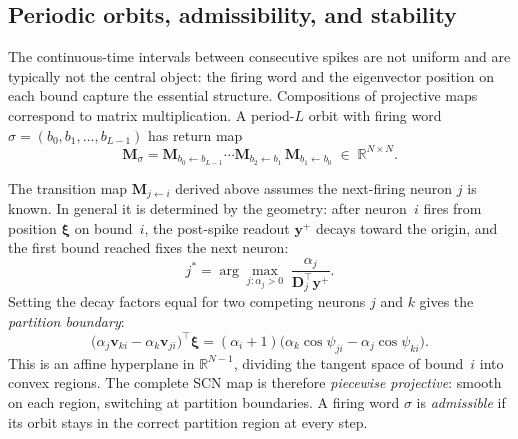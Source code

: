 \documentclass[12pt]{article}
\newcommand{\vv}[1]{\mathbf{#1}}
\newcommand{\DD}{\vv{D}}
\newcommand{\yy}{\vv{y}}
\newcommand{\xxi}{\boldsymbol{\xi}}
\newcommand{\RR}{\mathbb{R}}
\begin{document}
\subsection{Periodic orbits, admissibility, and stability}\label{sec:periodic}

The continuous-time intervals between consecutive spikes are not uniform and are typically not the central object: the firing word and the eigenvector position on each bound capture the essential structure. Compositions of projective maps correspond to matrix multiplication. A period-$L$ orbit with firing word $\sigma=(b_0,b_1,\ldots,b_{L-1})$ has return map
\begin{equation}\label{eq:return}
    \vv{M}_\sigma = \vv{M}_{b_0\leftarrow b_{L-1}}\cdots\vv{M}_{b_2\leftarrow b_1}\,\vv{M}_{b_1\leftarrow b_0}\;\in\;\RR^{N\times N}.
\end{equation}

\label{sec:partition}
The transition map $\vv M_{j\leftarrow i}$ derived above assumes the next-firing neuron $j$ is known. In general it is determined by the geometry: after neuron~$i$ fires from position $\xxi$ on bound~$i$, the post-spike readout $\yy^+$ decays toward the origin, and the first bound reached fixes the next neuron:
\begin{equation}\label{eq:first-bound}
    j^* = \arg\max_{j:\alpha_j>0}\;\frac{\alpha_j}{\DD_j^\top\yy^+}.
\end{equation}
Setting the decay factors equal for two competing neurons $j$ and $k$ gives the \emph{partition boundary}:
\begin{equation}\label{eq:partition}
    \bigl(\alpha_j\vv{v}_{ki}-\alpha_k\vv{v}_{ji}\bigr)^\top\xxi = (\alpha_i+1)\bigl(\alpha_k\cos\psi_{ji}-\alpha_j\cos\psi_{ki}\bigr).
\end{equation}
This is an affine hyperplane in $\RR^{N-1}$, dividing the tangent space of bound~$i$ into convex regions. The complete SCN map is therefore \emph{piecewise projective}: smooth on each region, switching at partition boundaries. A firing word $\sigma$ is \emph{admissible} if its orbit stays in the correct partition region at every step.
\end{document}
